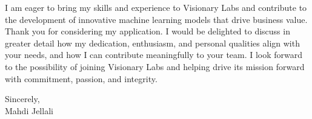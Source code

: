 \documentclass[letterpaper,11pt]{article}
\begin{document}
    I am eager to bring my skills and experience to Visionary Labs and contribute to the development of innovative machine learning models that drive business value. Thank you for considering my application. I would be delighted to discuss in greater detail how my dedication, enthusiasm, and personal qualities align with your needs, and how I can contribute meaningfully to your team. I look forward to the possibility of joining Visionary Labs and helping drive its mission forward with commitment, passion, and integrity.

    Sincerely,\\[12pt]

    Mahdi Jellali
\end{document}

